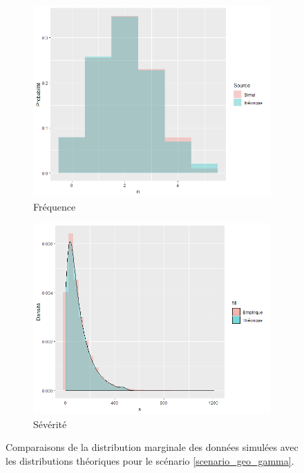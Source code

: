 \documentclass{article}
\begin{document}
	\begin{figure}[H]
		\begin{subfigure}[l]{0.5\textwidth}
			\includegraphics[width=\textwidth]{Graph/geo_gamma_N.png}
			\caption{Fréquence}
		\end{subfigure}
		\begin{subfigure}[r]{0.5\textwidth}
			\includegraphics[width=\textwidth]{Graph/geo_gamma_X.png}
			\caption{Sévérité}
		\end{subfigure}
		\caption{Comparaisons de la distribution marginale des données simulées avec les distributions théoriques pour le scénario \ref{scenario_geo_gamma}.}
		\label{graph_densite_geo_gamma}
	\end{figure}
	
\end{document}
